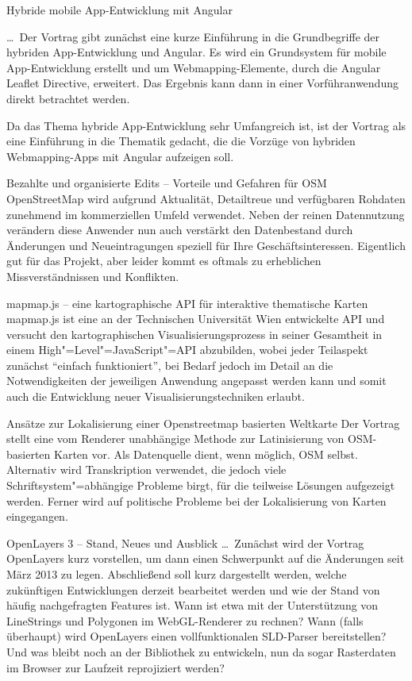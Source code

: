%
{Hybride mobile App-Entwicklung mit Angular}%
{}%
{\dots\ Der Vortrag gibt zunächst eine kurze Einführung in die Grundbegriffe
der hybriden App-Entwicklung und Angular. Es wird ein Grundsystem für mobile
App-Entwicklung erstellt und um Webmapping-Elemente, durch die Angular Leaflet Directive,
erweitert. Das Ergebnis kann dann in einer Vorführanwendung direkt betrachtet werden.

Da das Thema hybride App-Entwicklung sehr Umfangreich ist, ist der Vortrag als eine
Einführung in die Thematik gedacht, die die Vorzüge von hybriden Webmapping-Apps mit
Angular aufzeigen soll.}

%
{Bezahlte und organisierte Edits -- Vorteile und Gefahren für OSM}%
{}%
{OpenStreetMap wird aufgrund Aktualität, Detailtreue und verfügbaren Rohdaten
zunehmend im kommerziellen Umfeld verwendet. Neben der reinen
Datennutzung verändern diese Anwender nun auch verstärkt den
Datenbestand durch Änderungen und Neueintragungen speziell für Ihre
Geschäftsinteressen. Eigentlich gut für das Projekt, aber leider kommt
es oftmals zu erheblichen Missverständnissen und Konflikten.}

%
{mapmap.js -- eine kartographische API für interaktive thematische Karten}%
{}%
{mapmap.js ist eine an der Technischen Universität Wien entwickelte API und
versucht den kartographischen
Visualisierungsprozess in seiner Gesamtheit in einem High"=Level"=Java\-Script"=API
abzubilden, wobei jeder Teilaspekt zunächst "`einfach funktioniert"', bei
Bedarf jedoch im Detail an die Notwendigkeiten der jeweiligen Anwendung angepasst werden
kann und somit auch die Entwicklung neuer Visualisierungstechniken erlaubt.}

%
{Ansätze zur Lokalisierung einer Openstreetmap basierten \mbox{Weltkarte}}%
{}%
{Der Vortrag stellt eine vom Renderer unabhängige Methode zur Latinisierung
von OSM-basierten Karten vor. Als Datenquelle dient, wenn möglich, OSM
selbst. Alternativ wird Transkription verwendet, die jedoch viele
Schriftsystem"=abhängige Probleme birgt, für die teilweise Lösungen
aufgezeigt werden. Ferner wird auf politische Probleme bei der Lokalisierung
von Karten eingegangen.}

%
{OpenLayers 3 -- Stand, Neues und Ausblick}%
{}%
{\dots\ Zunächst wird der Vortrag OpenLayers kurz vorstellen, um dann einen Schwerpunkt auf
die Änderungen seit März 2013 zu legen. Abschließend soll kurz dargestellt werden,
welche zukünftigen Entwicklungen derzeit bearbeitet werden und wie der Stand von
häufig nachgefragten Features ist. Wann ist etwa mit der Unterstützung von
LineStrings und Polygonen im WebGL-Renderer zu rechnen? Wann (falls überhaupt)
wird OpenLayers einen vollfunktionalen SLD-Parser bereitstellen? Und was bleibt
noch an der Bibliothek zu entwickeln, nun da sogar Raster\-daten im Browser zur
Laufzeit reprojiziert werden?}

